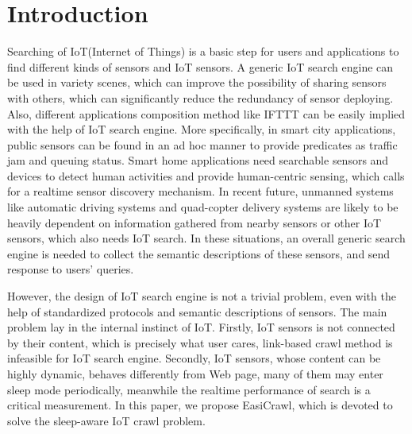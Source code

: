 \documentclass[conference]{IEEEtran}
\begin{document}
\IEEEpeerreviewmaketitle

\section{Introduction}
Searching of IoT(Internet of Things) is a basic step for users and applications to find different kinds of sensors and IoT sensors. 
A generic IoT search engine can be used in variety scenes, which can improve the possibility of sharing sensors with others, which can significantly reduce the redundancy of sensor deploying. Also, different applications composition method like IFTTT\cite{ifttt} can be easily implied with the help of IoT search engine.
More specifically, in smart city applications, public sensors can be found in an ad hoc manner to provide predicates as traffic jam and queuing status. 
Smart home applications need searchable sensors and devices to detect human activities and provide human-centric sensing, which calls for a realtime sensor discovery mechanism. In recent future, unmanned systems like automatic driving systems and quad-copter delivery systems are likely to be heavily dependent on information gathered from nearby sensors or other IoT sensors, which also needs IoT search. In these situations, an overall generic search engine is needed to collect the semantic descriptions of these sensors, and send response to users' queries. 


However, the design of IoT search engine is not a trivial problem, even with the help of standardized protocols and semantic descriptions of sensors. The main problem lay in the internal instinct of IoT. Firstly, IoT sensors is not connected by their content, which is precisely what user cares, link-based crawl method is infeasible for IoT search engine. Secondly, IoT sensors, whose content can be highly dynamic, behaves differently from Web page, many of them may enter sleep mode periodically, meanwhile the realtime performance of search is a critical measurement. In this paper, we propose EasiCrawl, which is devoted to solve the sleep-aware IoT crawl problem.
\end{document}
